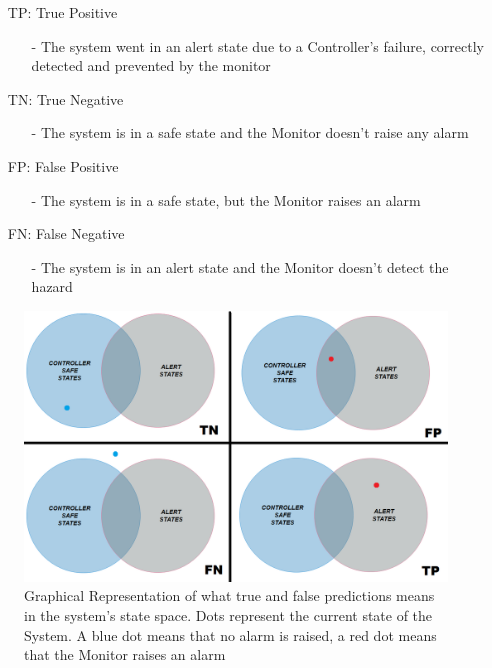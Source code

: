 \begin{itemize}
	\item[TP:] True Positive
	\begin{itemize}
		\item[-] The system went in an alert state due to a Controller's failure, correctly detected and prevented by the monitor
	\end{itemize}
	\item[TN:] True Negative
	\begin{itemize}
		\item[-] The system is in a safe state and the Monitor doesn't raise any alarm
	\end{itemize}
	\item[FP:] False Positive
	\begin{itemize}
		\item[-] The system is in a safe state, but the Monitor raises an alarm
	\end{itemize}
	\item[FN:] False Negative
	\begin{itemize}
		\item[-] The system is in an alert state and the Monitor doesn't detect the hazard
	\end{itemize}
\end{itemize}


\begin{figure}[h!]
	\includegraphics[width=\textwidth]{img/positive-negative-set.png}
	\caption{Graphical Representation of what true and false predictions means in the system's state space. Dots represent the current state of the System. A blue dot means that no alarm is raised, a red dot means that the Monitor raises an alarm}
\end{figure}


